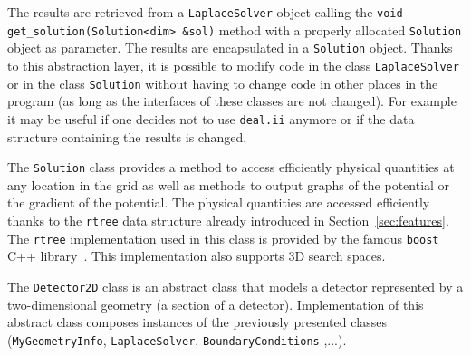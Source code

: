 \documentclass[11pt]{article}
\begin{document}
		The results are retrieved from a \texttt{LaplaceSolver} object
		calling the \newline\lstinline{void get_solution(Solution<dim> &sol)}
		method with a properly allocated \texttt{Solution} object as parameter.
		The results are encapsulated in a \texttt{Solution} object. Thanks to this
		abstraction layer, it is possible to modify code in the class \texttt{LaplaceSolver}
		or in the class \texttt{Solution} without having to change code in other
		places in the program (as long as the interfaces of these classes are not
		changed). For example it may be useful if one decides not to use \texttt{deal.ii}
		anymore or if the data structure containing the results is changed.

		The \texttt{Solution} class provides a method to access efficiently physical
		quantities at any location in the grid as well as methods to output graphs
		of the potential or the gradient of the potential. The physical quantities
		are accessed efficiently thanks to the \texttt{rtree} data structure already
		introduced in Section~\ref{sec:features}. The \texttt{rtree} implementation
		used in this class is provided by the famous \texttt{boost} C++ library~\cite{boost.rtree}.
		This implementation also supports 3D search spaces.

		The \texttt{Detector2D} class is an abstract class that models a detector
		represented by a two-dimensional geometry (a section of a detector). Implementation
		of this abstract class composes instances of the previously presented classes
		(\texttt{MyGeometryInfo}, \texttt{LaplaceSolver}, \texttt{BoundaryConditions}
		,...).
\end{document}
